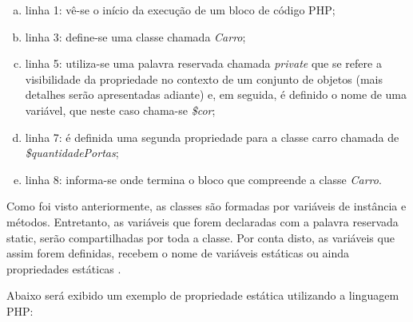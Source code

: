 \begin{enumerate}[a)]
    \item linha 1: vê-se o início da execução de um bloco de código PHP;
    \item linha 3: define-se uma classe chamada \textit{Carro};
    \item linha 5: utiliza-se uma palavra reservada chamada
    \textit{private} que se refere a visibilidade da propriedade no contexto  de
    um conjunto de objetos (mais detalhes serão apresentadas adiante) e, em
    seguida, é definido o nome de uma variável, que neste caso chama-se \textit{\$cor};
    \item linha 7: é definida uma segunda propriedade para a classe
    carro chamada de \textit{\$quantidadePortas};
    \item linha 8: informa-se onde termina o bloco que compreende a
    classe \textit{Carro}.
\end{enumerate}


Como foi visto anteriormente, as classes são formadas por variáveis de instância
e métodos. Entretanto, as variáveis que forem declaradas com a palavra reservada
static, serão compartilhadas por toda a classe. Por conta disto, as variáveis
que assim forem definidas, recebem o nome de variáveis estáticas ou ainda
propriedades estáticas \cite{learningJava}.

Abaixo será exibido um exemplo de propriedade estática utilizando a linguagem
PHP:
